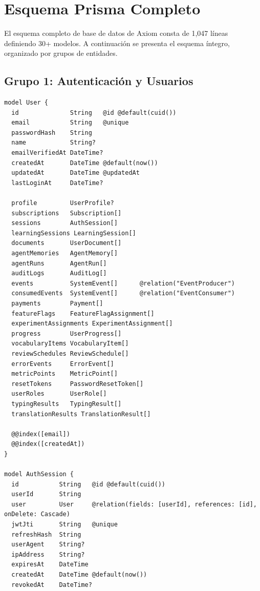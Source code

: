 

\chapter{Esquema Prisma Completo}
\label{app:prisma-schema}

El esquema completo de base de datos de Axiom consta de 1,047 líneas definiendo 30+ modelos. A continuación se presenta el esquema íntegro, organizado por grupos de entidades.

\section{Grupo 1: Autenticación y Usuarios}

\begin{lstlisting}[style=sql,caption={Modelos de autenticación y usuarios}]
model User {
  id              String   @id @default(cuid())
  email           String   @unique
  passwordHash    String
  name            String?
  emailVerifiedAt DateTime?
  createdAt       DateTime @default(now())
  updatedAt       DateTime @updatedAt
  lastLoginAt     DateTime?

  profile         UserProfile?
  subscriptions   Subscription[]
  sessions        AuthSession[]
  learningSessions LearningSession[]
  documents       UserDocument[]
  agentMemories   AgentMemory[]
  agentRuns       AgentRun[]
  auditLogs       AuditLog[]
  events          SystemEvent[]      @relation("EventProducer")
  consumedEvents  SystemEvent[]      @relation("EventConsumer")
  payments        Payment[]
  featureFlags    FeatureFlagAssignment[]
  experimentAssignments ExperimentAssignment[]
  progress        UserProgress[]
  vocabularyItems VocabularyItem[]
  reviewSchedules ReviewSchedule[]
  errorEvents     ErrorEvent[]
  metricPoints    MetricPoint[]
  resetTokens     PasswordResetToken[]
  userRoles       UserRole[]
  typingResults   TypingResult[]
  translationResults TranslationResult[]

  @@index([email])
  @@index([createdAt])
}

model AuthSession {
  id           String   @id @default(cuid())
  userId       String
  user         User     @relation(fields: [userId], references: [id], onDelete: Cascade)
  jwtJti       String   @unique
  refreshHash  String
  userAgent    String?
  ipAddress    String?
  expiresAt    DateTime
  createdAt    DateTime @default(now())
  revokedAt    DateTime?


\end{lstlisting}
